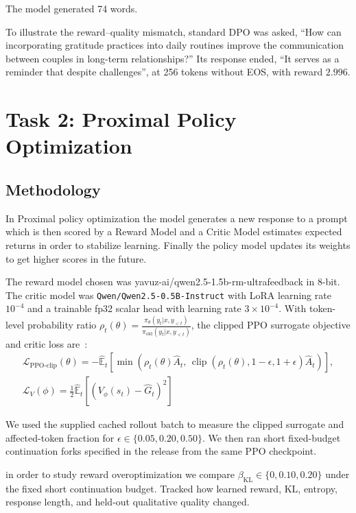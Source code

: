 \documentclass{article}
\begin{document}
The model generated 74 words.

To illustrate the reward--quality mismatch, standard DPO was asked, ``How can incorporating gratitude practices into daily routines improve the communication between couples in long-term relationships?'' Its response ended, ``It serves as a reminder that despite challenges'', at 256 tokens without EOS, with reward $2.996$.
\section{Task 2: Proximal Policy Optimization}
\label{sec:task2}

\subsection{Methodology}
In Proximal policy optimization the model generates a new response to a prompt  which is then scored by a Reward Model and a Critic Model estimates expected returns in order to stabilize learning. Finally the policy model updates its weights to get higher scores in the future.

The reward model chosen was yavuz-ai/qwen2.5-1.5b-rm-ultrafeedback in 8-bit. The critic model was \texttt{Qwen/Qwen2.5-0.5B-Instruct} with LoRA learning rate $10^{-4}$ and a trainable fp32 scalar head with learning rate $3\times10^{-4}$.
With token-level probability ratio $\rho_t(\theta) = \frac{\pi_\theta(y_t | x, y_{<t})}{\pi_{\text{old}}(y_t | x, y_{<t})}$, the clipped PPO surrogate objective and critic loss are~\cite{schulman2017proximal}:
\begin{equation}
\begin{gathered}
\mathcal{L}_{\text{PPO-clip}}(\theta) = -\hat{\mathbb{E}}_t \left[ \min\left(\rho_t(\theta) \hat{A}_t, \, \operatorname{clip}(\rho_t(\theta), 1-\epsilon, 1+\epsilon)\hat{A}_t\right) \right], \\
\mathcal{L}_V(\phi) = \frac{1}{2}\hat{\mathbb{E}}_t\left[(V_\phi(s_t) - \hat{G}_t)^2\right]
\end{gathered}
\label{eq:ppo}
\end{equation}

We used the supplied cached rollout batch to measure the clipped surrogate and affected-token fraction for $\epsilon \in \{0.05,0.20,0.50\}$. We then ran short fixed-budget continuation forks specified in the release from the same PPO checkpoint.

in order to study reward overoptimization we compare $\beta_{\mathrm{KL}} \in \{0,0.10,0.20\}$ under the
fixed short continuation budget. Tracked how learned reward, KL, entropy, response length, and held-out qualitative
quality changed. 
\end{document}
